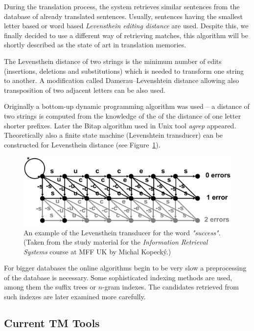 During the translation process, the system retrieves similar sentences from the database of already translated sentences. Usually, sentences having the smallest letter based or word based \emph{Levensthein editing distance} are used. Despite this, we finally decided to use a different way of retrieving matches, this algorithm will be shortly described as the state of art in translation memories.

The Levensthein distance of two strings is the minimum number of edits (insertions, deletions and substitutions) which is needed to transform one string to another. A modification called Damerau–Levenshtein distance allowing also transposition of two adjacent letters can be also used.

Originally a bottom-up dynamic programming algorithm was used -- a distance of two strings is computed from the knowledge of the of the distance of one letter shorter prefixes. Later the Bitap algorithm used in Unix tool \emph{agrep} appeared. Theoretically also a finite state machine (Levenshtein transducer) can be constructed for Levensthein distance (see Figure~\ref{fig:levensthein_transducer}).

\begin{figure}
\begin{center}
\includegraphics[scale=0.65]{./figures/levensthein.pdf}
\end{center}

\caption{An example of the Levensthein transducer for the word \emph{"success"}. (Taken from the study material for the \emph{Information Retrieval Systems} course at MFF UK by Michal Kopecký.)}
\label{fig:levensthein_transducer}
\end{figure}

For bigger databases the online algorithms begin to be very slow a preprocessing of the database is necessary. Some sophisticated indexing methods are used, among them the suffix trees or $n$-gram indexes. The candidates retrieved from such indexes are later examined more carefully.

\subsection{Current TM Tools}

